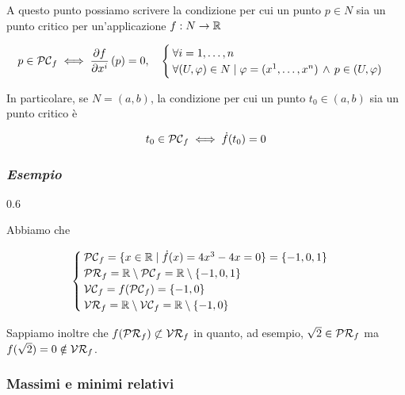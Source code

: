A questo punto possiamo scrivere la condizione per cui un punto $ p \in N $ sia un punto critico per un'applicazione $ f : N \to \mathbb{R} $

\begin{equation}
	p \in \PC_{f} %
	\iff %
	\dpdv{f}{x^{i}} \, (p) = 0 \qcomma %
	\begin{cases}
		\forall i=1,\dots,n \\
		\forall (U,\varphi) \in N \mid \varphi = (x^{1},\dots,x^{n}) \, \wedge \, p \in (U,\varphi)
	\end{cases}
\end{equation}

In particolare, se $ N = (a,b) $, la condizione per cui un punto $ t_{0} \in (a,b) $ sia un punto critico è

\begin{equation}
	t_{0} \in \mathcal{PC}_{f} \iff \dot{f}(t_{0}) = 0
\end{equation}

\subsubsection{\textit{Esempio}}

	{0.6}{%
			}

Abbiamo che

\begin{equation}
	\begin{cases}
		\mathcal{PC}_{f} = \{ x \in \mathbb{R} \mid \dot{f}(x) = 4 x^{3} - 4 x = 0 \} = \{ -1, 0, 1 \} \\
		\mathcal{PR}_{f} = \mathbb{R} \setminus \mathcal{PC}_{f} = \mathbb{R} \setminus \{ -1, 0, 1 \} \\
		\mathcal{VC}_{f} = f(\mathcal{PC}_{f}) = \{ -1, 0 \} \\
		\mathcal{VR}_{f} = \mathbb{R} \setminus \mathcal{VC}_{f} = \mathbb{R} \setminus \{ -1, 0 \}
	\end{cases}
\end{equation}

Sappiamo inoltre che $ f(\mathcal{PR}_{f}) \not\subset \mathcal{VR}_{f} $ in quanto, ad esempio, $ \sqrt{2} \in \mathcal{PR}_{f} $ ma $ f(\sqrt{2}) = 0 \notin \mathcal{VR}_{f} $.

\subsubsection{Massimi e minimi relativi}

